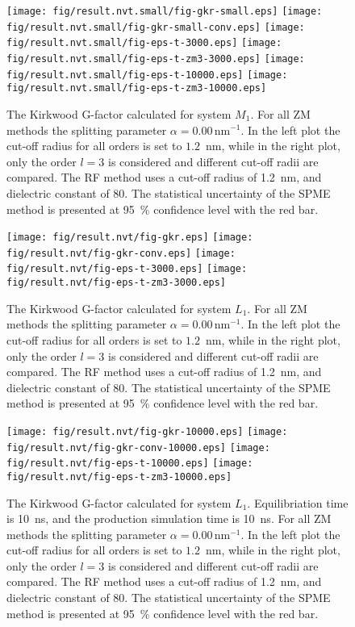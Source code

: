 \documentclass[aip,jcp,a4paper,preprint,unsortedaddress,onecolumn,fleqn]{revtex4-1}
\newcommand{\systemmb}{M_1}
\newcommand{\systemlb}{L_1}
\begin{document}
\begin{figure}
  \centering
  \texttt{[image: fig/result.nvt.small/fig-gkr-small.eps]}
  \texttt{[image: fig/result.nvt.small/fig-gkr-small-conv.eps]}
  \texttt{[image: fig/result.nvt.small/fig-eps-t-3000.eps]}
  \texttt{[image: fig/result.nvt.small/fig-eps-t-zm3-3000.eps]}
  \texttt{[image: fig/result.nvt.small/fig-eps-t-10000.eps]}
  \texttt{[image: fig/result.nvt.small/fig-eps-t-zm3-10000.eps]}
  \caption{The Kirkwood G-factor calculated for system $\systemmb$.
    For all ZM methods the splitting parameter $\alpha = 0.00\,\textrm{nm}^{-1}$.
    In the left plot the cut-off radius for all orders is set to $1.2$~nm, while
    in the right plot, only the order $l=3$ is considered and different cut-off radii are compared.
    The RF method uses a cut-off radius of 1.2~nm, and dielectric constant of 80.
    The statistical uncertainty of the SPME method is presented at 95~\% confidence level with the red bar.
  }
  \label{fig:tmp1}
\end{figure}

\begin{figure}
  \centering
  \texttt{[image: fig/result.nvt/fig-gkr.eps]}
  \texttt{[image: fig/result.nvt/fig-gkr-conv.eps]}
  \texttt{[image: fig/result.nvt/fig-eps-t-3000.eps]}
  \texttt{[image: fig/result.nvt/fig-eps-t-zm3-3000.eps]}
  \caption{The Kirkwood G-factor calculated for system $\systemlb$.
    For all ZM methods the splitting parameter $\alpha = 0.00\,\textrm{nm}^{-1}$.
    In the left plot the cut-off radius for all orders is set to $1.2$~nm, while
    in the right plot, only the order $l=3$ is considered and different cut-off radii are compared.
    The RF method uses a cut-off radius of 1.2~nm, and dielectric constant of 80.
    The statistical uncertainty of the SPME method is presented at 95~\% confidence level with the red bar.
  }
  \label{fig:tmp2}
\end{figure}

\begin{figure}
  \centering
  \texttt{[image: fig/result.nvt/fig-gkr-10000.eps]}
  \texttt{[image: fig/result.nvt/fig-gkr-conv-10000.eps]}
  \texttt{[image: fig/result.nvt/fig-eps-t-10000.eps]}
  \texttt{[image: fig/result.nvt/fig-eps-t-zm3-10000.eps]}
  \caption{The Kirkwood G-factor calculated for system $\systemlb$. Equilibriation time is 10~ns, and the production simulation time is 10~ns.
    For all ZM methods the splitting parameter $\alpha = 0.00\,\textrm{nm}^{-1}$.
    In the left plot the cut-off radius for all orders is set to $1.2$~nm, while
    in the right plot, only the order $l=3$ is considered and different cut-off radii are compared.
    The RF method uses a cut-off radius of 1.2~nm, and dielectric constant of 80.
    The statistical uncertainty of the SPME method is presented at 95~\% confidence level with the red bar.
  }
  \label{fig:tmp3}
\end{figure}
\end{document}
